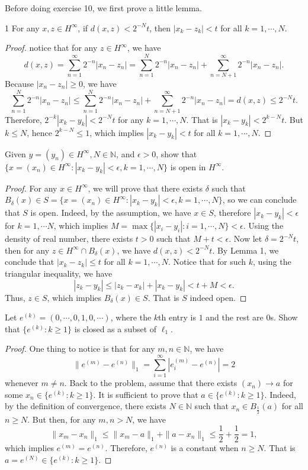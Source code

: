 \documentclass[12pt, a4paper]{article}
\theoremstyle{plain}
\newcommand{\N}{\mathbb{N}}
\begin{document}
Before doing exercise 10, we first prove a little lemma.
	\begin{lemma}1
	For any $x,z\in H^\infty$, if $d(x,z)<2^{-N}t$, then $|x_k-z_k|<t$ for all $k=1,\cdots,N$.
	\end{lemma}
		\begin{proof}
		notice that for any $z\in H^\infty$, we have
	\[
	d(x,z)=\sum_{n=1}^{\infty}{2^{-n}|x_n-z_n|}=\sum_{n=1}^{N}{2^{-n}|x_n-z_n|}+\sum_{n=N+1}^{\infty}{2^{-n}|x_n-z_n|}.
	\]
	Because $|x_n-z_n|\geq 0$, we have
	\[
	\sum_{n=1}^{N}{2^{-n}|x_n-z_n|}\leq \sum_{n=1}^{N}{2^{-n}|x_n-z_n|}+\sum_{n=N+1}^{\infty}{2^{-n}|x_n-z_n|}=d(x,z)\leq 2^{-N}t.
	\]
	Therefore, $2^{-k}|x_k-y_k|<2^{-N}t$ for any $k=1,\cdots,N$. That is $|x_k-y_k|<2^{k-N}t$. But $k\leq N$, hence $2^{k-N}\leq 1$, which implies $|x_k-y_k|<t$ for all $k=1,\cdots,N$.
		\end{proof}
\begin{exercise}{10}
Given $y=(y_n)\in H^\infty,N\in\N$, and $\epsilon >0$, show that $\{x=(x_n)\in H^\infty:|x_k-y_k|<\epsilon ,k=1,\cdots ,N\}$ is open in $H^\infty$.
\end{exercise}
	
	\begin{proof}
	For any $x\in H^\infty$, we will prove that there exists $\delta$ such that $B_\delta(x)\in S=\{x=(x_n)\in H^\infty:|x_k-y_k|<\epsilon, k=1,\cdots ,N\}$, so we can conclude that $S$ is open. Indeed, by the assumption, we have $x\in S$, therefore $|x_k-y_k|<\epsilon$ for $k=1,\cdots N$, which implies $M=\max\{|x_i-y_i|:i=1,\cdots,N\}<\epsilon$. Using the density of real number, there exists $t>0$ such that $M+t<\epsilon$. Now let $\delta=2^{-N}t$, then for any $z\in H^\infty\cap B_\delta(x)$, we have $d(x,z)<2^{-N}t$. By Lemma 1, we conclude that $|x_k-z_k|\leq t$ for all $k=1,\cdots,N$. Notice that for such $k$, using the triangular inequality, we have
	\[
	|z_k-y_k|\leq |z_k-x_k|+|x_k-y_k|<t+M<\epsilon.
	\]
	Thus, $z\in S$, which implies $B_\delta(x)\in S$. That is $S$ indeed open.
	\end{proof}

\begin{exercise}{11}
Let $e^{(k)}=(0,\cdots,0,1,0,\cdots)$, where the $k$th entry is $1$ and the rest are $0$s. Show that $\{e^{(k)}:k\geq 1\}$ is closed as a subset of $\ell_1$.
\end{exercise}
	\begin{proof}
	One thing to notice is that for any $m,n\in \N$, we have 
	\[
	\|e^{(m)}-e^{(n)}\|_1=\sum_{i=1}^{\infty}{|e^{(m)}_i-e^{(n)}|}=2
	\]
	whenever $m\neq n$. Back to the problem, assume that there exists $(x_n)\rightarrow a$ for some $x_n\in \{e^{(k)}:k\geq 1\}$. It is sufficient to prove that $a\in \{e^{(k)}:k\geq 1\}$. Indeed, by the definition of convergence, there exists $N\in\N$ such that $x_n\in B_{\frac{1}{2}}(a)$ for all $n\geq N$. But then, for any $m,n>N$, we have 
	\[
	\|x_m-x_n\|_1\leq \|x_m-a\|_1+\|a-x_n\|_1\leq \frac{1}{2}+\frac{1}{2}=1,
	\]
	which implies $e^{(m)}=e^{(n)}$. Therefore, $e^{(n)}$ is a constant when $n\geq N$. That is $a=e^{(N)}\in \{e^{(k)}:k\geq 1\}$.
	\end{proof}
\end{document}
